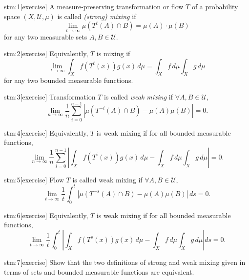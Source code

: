 
\begin{stm}{stm:1}[exercise]
A measure-preserving transformation or flow $T$ of a probability space $(X, \mathcal{U}, \mu)$ is called \textit{(strong) mixing} if
\[
\lim_{t \to \infty} \mu(T^t(A) \cap B) = \mu(A) \cdot \mu(B)
\]
for any two measurable sets $A, B \in \mathcal{U}$.
\end{stm}

\begin{stm}{stm:2}[exercise]
Equivalently, $T$ is mixing if
\[
\lim_{t \to \infty} \int_X f(T^t(x)) g(x) \, d\mu = \int_X f \, d\mu \int_X g \, d\mu
\]
for any two bounded measurable functions.
\end{stm}

\begin{stm}{stm:3}[exercise]
Transformation $T$ is called \textit{weak mixing} if $\forall A, B \in \mathcal{U}$,
\[
\lim_{n \to \infty} \frac{1}{n} \sum_{i=0}^{n-1} \left| \mu(T^{-i}(A) \cap B) - \mu(A)\mu(B) \right| = 0.
\]
\end{stm}

\begin{stm}{stm:4}[exercise]
Equivalently, $T$ is weak mixing if for all bounded measurable functions,
\[
\lim_{n \to \infty} \frac{1}{n} \sum_{i=0}^{n-1} \left| \int_X f(T^i(x)) g(x) \, d\mu - \int_X f \, d\mu \int_X g \, d\mu \right| = 0.
\]
\end{stm}

\begin{stm}{stm:5}[exercise]
Flow $T$ is called weak mixing if $\forall A, B \in \mathcal{U}$,
\[
\lim_{t \to \infty} \frac{1}{t} \int_0^t \left| \mu(T^{-s}(A) \cap B) - \mu(A)\mu(B) \right| \, ds = 0.
\]
\end{stm}

\begin{stm}{stm:6}[exercise]
Equivalently, $T$ is weak mixing if for all bounded measurable functions,
\[
\lim_{t \to \infty} \frac{1}{t} \int_0^t \left| \int_X f(T^s(x))g(x) \, d\mu - \int_X f \, d\mu \int_X g \, d\mu \right| ds = 0.
\]
\end{stm}

\begin{stm}{stm:7}[exercise]
Show that the two definitions of strong and weak mixing given in terms of sets and bounded measurable functions are equivalent.
\end{stm}


